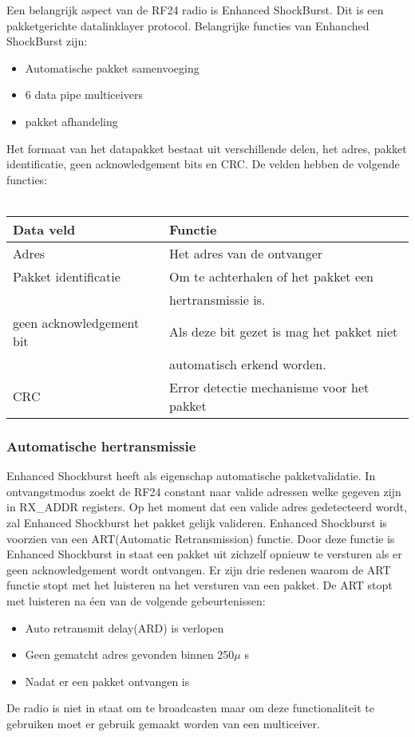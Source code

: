 \documentclass{article}
\begin{document}
Een belangrijk aspect van de RF24 radio is Enhanced ShockBurst. Dit is een pakketgerichte datalinklayer protocol.
Belangrijke functies van Enhanched ShockBurst zijn:
\begin{itemize}
	\item Automatische pakket samenvoeging
	\item 6 data pipe multiceivers
	\item pakket afhandeling
\end{itemize}
Het formaat van het datapakket bestaat uit verschillende delen, het adres, pakket identificatie, geen acknowledgement bits en CRC. De velden hebben de volgende functies:
\\
\\
\begin{tabular}{ | l | l |}
    \hline
    Data veld					& Functie	\\ \hline
    Adres						& Het adres van de ontvanger	\\ \hline
    Pakket identificatie		& Om te achterhalen of het pakket een \\
    							& hertransmissie is.\\\hline
    geen acknowledgement bit	& Als deze bit gezet is mag het pakket niet\\
    							& automatisch erkend worden.	\\ \hline
    CRC							& Error detectie mechanisme voor het pakket			\\ \hline
    \end{tabular}
    
\subsubsection{Automatische hertransmissie}

Enhanced Shockburst heeft als eigenschap automatische pakketvalidatie. In ontvangstmodus zoekt de RF24 constant naar valide adressen welke gegeven zijn in RX\_ADDR registers. Op het moment dat een valide adres gedetecteerd wordt, zal Enhanced Shockburst het pakket gelijk valideren. Enhanced Shockburst is voorzien van een ART(Automatic Retransmission) functie. Door deze functie is Enhanced Shockburst in staat een pakket uit zichzelf opnieuw te versturen als er geen acknowledgement wordt ontvangen. Er zijn drie redenen waarom de ART functie stopt met het luisteren na het versturen van een pakket. De ART stopt met luisteren na \'{e}en van de volgende gebeurtenissen:
\begin{itemize}
	\item Auto retransmit delay(ARD) is verlopen
	\item Geen gematcht adres gevonden binnen 250$\mu$ s
	\item Nadat er een pakket ontvangen is
\end{itemize}
De radio is niet in staat om te broadcasten maar om deze functionaliteit te gebruiken moet er gebruik gemaakt worden van een multiceiver. 
\end{document}
